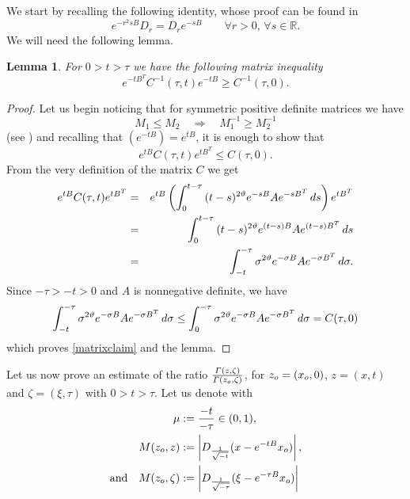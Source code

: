 \documentclass{amsart}
\newtheorem{lemma}[thm]{Lemma}
\numberwithin{equation}{section}
\def \r{{\mathbb{R}}}
\renewcommand{\Gamma}{\varGamma}
\begin{document}
{{We start by recalling the following identity, whose proof can be found in \cite[Remark 2.1]{LP94}
\begin{equation}\label{eq:commutator}
e^{-r^2sB}D_r=D_r e^{-sB}\qquad \forall r>0,\, \forall s\in \r.
\end{equation}
We will need the following lemma.
\begin{lemma}\label{matinv}
For $0>t>\tau$ we have the following matrix inequality
$$e^{-tB^T}C^{-1}(\tau,t)e^{-tB}\geq C^{-1}(\tau,0).$$
\end{lemma}
\begin{proof}
Let us begin noticing that for symmetric positive definite matrices we have
\[
M_1\leq M_2\quad \Rightarrow\quad M_1^{-1}\geq M_2^{-1}
\]
(see \cite[Corollary 7.7.4]{HJ90}) and recalling that $(e^{-tB})=e^{tB}$, it is enough to show that
\begin{equation}\label{matrixclaim}
e^{t B}C(\tau,t)e^{t B^T}\leq C(\tau,0).
\end{equation}
From the very definition of the matrix $C$ we get
\begin{eqnarray*}
e^{t B}C(\tau,t)e^{t B^T}&=& e^{tB}\left(\int_{0}^{t-\tau}{(t-s)^{2\vartheta}e^{-sB}Ae^{-sB^T}}\,\rm{d}s\right)e^{tB^T}\\
& = & \int_{0}^{t-\tau}{(t-s)^{2\vartheta} e^{(t-s)B}Ae^{(t-s)B^T}}\,\rm{d}s\\
&=&\int_{-t}^{-\tau}\sigma^{2\vartheta}{e^{-\sigma B}Ae^{-\sigma B^T}}\,\rm{d}\sigma.
\end{eqnarray*}
Since $-\tau>-t>0$ and $A$ is nonnegative definite, we have 
\[
\int_{-t}^{-\tau}{\sigma^{2\vartheta}e^{-\sigma B}Ae^{-\sigma B^T}}\,\rm{d}\sigma\leq \int_{0}^{-\tau}{\sigma^{2\vartheta}e^{-\sigma B}A e^{-\sigma B^T}}\,\rm{d}\sigma = C(\tau,0)
\]
which proves \eqref{matrixclaim} and the lemma.
\end{proof}



Let us now prove an estimate of the ratio $\frac{\Gamma(z,\zeta)}{\Gamma(z_{\rm o},\zeta)}$, for $z_{\rm o}=(x_{\rm o},0)$, $z=(x,t)$ and $\zeta=(\xi,\tau)$ with $0>t>\tau$. Let us denote with
\begin{equation}\label{eq:notation}
\begin{split}
\mu & :=\frac{-t}{-\tau}\in(0,1),\\
 {M}(z_{\rm o},z) & :=\left|D_{\frac{1}{\sqrt{-t}}}(x-e^{-tB}x_{\rm o})\right|,\\
 \text{and}\quad {M}(z_{\rm o},\zeta)& :=\left|D_{\frac{1}{\sqrt{-\tau}}}(\xi-e^{-\tau B}x_{\rm o})\right|
 \end{split}
\end{equation}

}}
\end{document}

